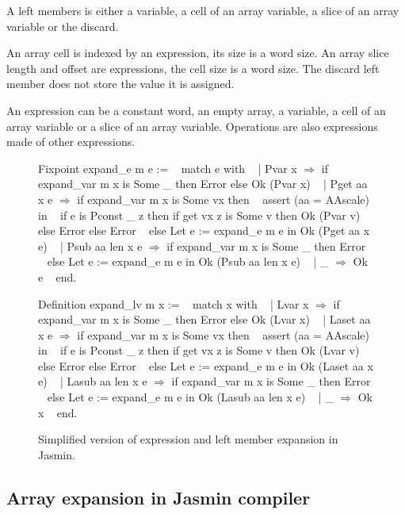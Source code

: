 \documentclass{article}
\begin{document}
\smallskip

A left members is either a variable, a cell of an array variable, a slice of an
array variable or the discard.

An array cell is indexed by an expression, its size is a word size. An array
slice length and offset are expressions, the cell size is a word size. The
discard left member does not store the value it is assigned.

An expression can be a constant word, an empty array, a variable, a cell of an
array variable or a slice of an array variable. Operations are also expressions
made of other expressions.

\begin{figure}[t]
\obeylines\obeyspaces\ttfamily%
Fixpoint expand\_e m e := 
~ match e with
~ | Pvar x \(\Rightarrow\) if expand\_var m x is Some \_ then Error else Ok (Pvar x)
~ | Pget aa x e \(\Rightarrow\) if expand\_var m x is Some vx then
~     assert (aa = AAscale) in
~     if e is Pconst \_ z then if get vx z is Some v then Ok (Pvar v)
~     else Error else Error
~   else Let e := expand\_e m e in Ok (Pget aa x e)
~ | Psub aa len x e \(\Rightarrow\) if expand\_var m x is Some \_ then Error
~   else Let e := expand\_e m e in Ok (Psub aa len x e)
~ | \_ \(\Rightarrow\) Ok e
~ end.

Definition expand\_lv m x :=
~ match x with
~ | Lvar x \(\Rightarrow\) if expand\_var m x is Some \_ then Error else Ok (Lvar x)
~ | Laset aa x e \(\Rightarrow\) if expand\_var m x is Some vx then
~     assert (aa = AAscale) in
~     if e is Pconst \_ z then if get vx z is Some v then Ok (Lvar v)
~     else Error else Error
~   else Let e := expand\_e m e in Ok (Laset aa x e)
~ | Lasub aa len x e \(\Rightarrow\) if expand\_var m x is Some \_ then Error
~   else Let e := expand\_e m e in Ok (Lasub aa len x e)
~ | \_ \(\Rightarrow\) Ok x
~ end.
\normalfont%
\caption{Simplified version of expression and left member expansion in Jasmin.}
\end{figure}

\subsection{Array expansion in Jasmin compiler}
\end{document}
